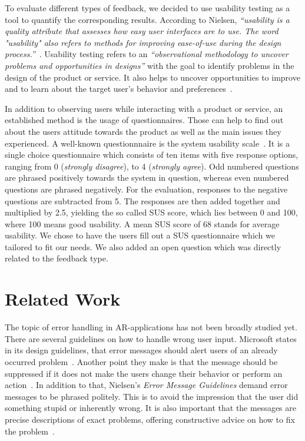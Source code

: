 \documentclass[manuscript]{acmart}
\begin{document}
		To evaluate different types of feedback, we decided to use usability testing as a tool to quantify the corresponding results. According to Nielsen, \textit{``usability is a quality attribute that assesses how easy user interfaces are to use. The word "usability" also refers to methods for improving ease-of-use during the design process.''}~\cite{Nielsen2012}. Usability testing refers to an \textit{``observational methodology to uncover problems and opportunities in designs''} with the goal to identify problems in the design of the product or service. It also helps to uncover opportunities to improve and to learn about the target user's behavior and preferences~\cite{Moran2019}.

		In addition to observing users while interacting with a product or service, an established method is the usage of questionnaires. Those can help to find out about the users attitude towards the product as well as the main issues they experienced. A well-known questionnnaire is the system usability scale~\cite{SUS2019}. It is a single choice questionnaire which consists of ten items with five response options, ranging from 0 (\emph{strongly disagree}), to 4 (\emph{strongly agree}). Odd numbered questions are phrased positively towards the system in question, whereas even numbered questions are phrased negatively. For the evaluation, responses to the negative questions are subtracted from 5. The responses are then added together and multiplied by 2.5, yielding the so called SUS score, which lies between 0 and 100, where 100 means good usability. A mean SUS score of 68 stands for average usability. We chose to have the users fill out a \ac{SUS} questionnaire which we tailored to fit our needs. We also added an open question which was directly related to the feedback type.

	\section{Related Work}\label{sec:relatedwork}
		The topic of error handling in \ac{AR}-applications has not been broadly studied yet. There are several guidelines on how to handle wrong user input. Microsoft states in its design guidelines, that error messages should alert users of an already occurred problem~\cite{Microsoft2018}. Another point they make is that the message should be suppressed if it does not make the users change their behavior or perform an action~\cite{Microsoft2018}. In addition to that, Nielsen's \textit{Error Message Guidelines} demand error messages to be phrased politely. This is to avoid the impression that the user did something stupid or inherently wrong. It is also important that the messages are precise descriptions of exact problems, offering constructive advice on how to fix the problem~\cite{Nielsen2001}.
\end{document}
